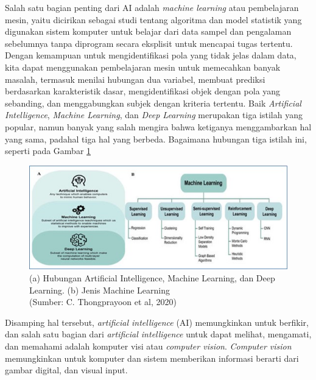 Salah satu bagian penting dari AI adalah \textit{machine learning} atau pembelajaran mesin, yaitu dicirikan sebagai studi tentang algoritma dan model statistik yang digunakan sistem komputer untuk belajar dari data sampel dan pengalaman sebelumnya tanpa diprogram secara eksplisit untuk mencapai tugas tertentu. Dengan kemampuan untuk mengidentifikasi pola yang tidak jelas dalam data, kita dapat menggunakan pembelajaran mesin untuk memecahkan banyak masalah, termasuk menilai hubungan dua variabel, membuat prediksi berdasarkan karakteristik dasar, mengidentifikasi objek dengan pola yang sebanding, dan menggabungkan subjek dengan kriteria tertentu. Baik \textit{Artificial Intelligence}, \textit{Machine Learning}, dan \textit{Deep Learning} merupakan tiga istilah yang popular, namun banyak yang salah mengira bahwa ketiganya menggambarkan hal yang sama, padahal tiga hal yang berbeda. Bagaimana hubungan tiga istilah ini, seperti pada Gambar \ref{img:Hubungan-Artificial-Intelligence}

\begin{figure}[H]
	\vspace{-0.1cm}
	\begin{center}
		\includegraphics[width=1\columnwidth]{bab2/Gambar/Picture1.jpg}
	\end{center}
	\vspace{-0.2cm}
	\caption{(a) Hubungan Artificial Intelligence, Machine Learning, dan Deep Learning. (b) Jenis Machine Learning\\(Sumber: C. Thongprayoon et al, 2020)}\label{img:Hubungan-Artificial-Intelligence}
\end{figure}

Disamping hal tersebut, \textit{artificial intelligence} (AI) memungkinkan untuk berfikir, dan salah satu bagian dari \textit{artificial intelligence} untuk dapat melihat, mengamati, dan memahami adalah komputer visi atau \textit{computer vision}. \textit{Computer vision} memungkinkan untuk komputer dan sistem memberikan informasi berarti dari gambar digital, dan visual input. 

